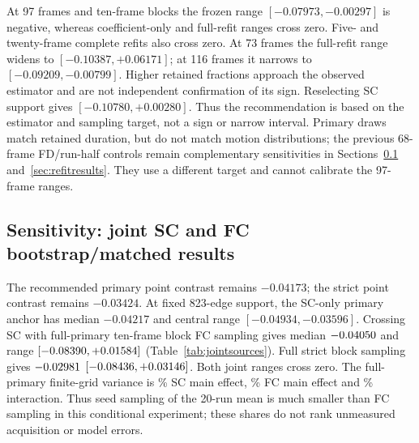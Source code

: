 \documentclass[11pt,a4paper]{article}
\begin{document}
At 97 frames and ten-frame blocks the frozen range $[-0.07973,-0.00297]$ is negative, whereas coefficient-only and full-refit ranges cross zero. Five- and twenty-frame complete refits also cross zero. At 73 frames the full-refit range widens to $[-0.10387,+0.06171]$; at 116 frames it narrows to $[-0.09209,-0.00799]$. Higher retained fractions approach the observed estimator and are not independent confirmation of its sign. Reselecting SC support gives $[-0.10780,+0.00280]$. Thus the recommendation is based on the estimator and sampling target, not a sign or narrow interval. Primary draws match retained duration, but do not match motion distributions; the previous 68-frame FD/run-half controls remain complementary sensitivities in Sections~\ref{sec:jointresults} and~\ref{sec:refitresults}. They use a different target and cannot calibrate the 97-frame ranges.

\subsection{Sensitivity: joint SC and FC bootstrap/matched results}\label{sec:jointresults}
The recommended primary point contrast remains $-0.04173$; the strict point contrast remains $-0.03424$. At fixed 823-edge support, the SC-only primary anchor has median $-0.04217$ and central range $[-0.04934,-0.03596]$. Crossing SC with full-primary ten-frame block FC sampling gives median $-0.04050{}$ and range $[-0.08390{},+0.01584{}]$ (Table~\ref{tab:jointsources}). Full strict block sampling gives $-0.02981{}$ $[-0.08436{},+0.03146{}]$. Both joint ranges cross zero. The full-primary finite-grid variance is \JointPrimarySCShare{}\% SC main effect, \JointPrimaryFCShare{}\% FC main effect and \JointPrimaryInteractionShare{}\% interaction. Thus seed sampling of the 20-run mean is much smaller than FC sampling in this conditional experiment; these shares do not rank unmeasured acquisition or model errors.
\begin{table}[H]\centering\small
\caption{Full-run, fixed-823-edge support: source-specific anchors and joint temporal/seed resampling. Blocks have ten original frames; nuisance fits remain fixed. SC-only uses observed full-run FC. Central ranges are conditional percentiles, not clinical confidence intervals.}\label{tab:jointsources}\end{table}
\begin{table}[H]\centering\scriptsize
\caption{Per-session joint coupling ranges for full-run ten-frame blocks. Paired contrast ranges are computed from the joint draws, not by subtracting these marginal endpoints. Support reselection changes the connection population.}\label{tab:jointsessions}\end{table}
\end{document}
